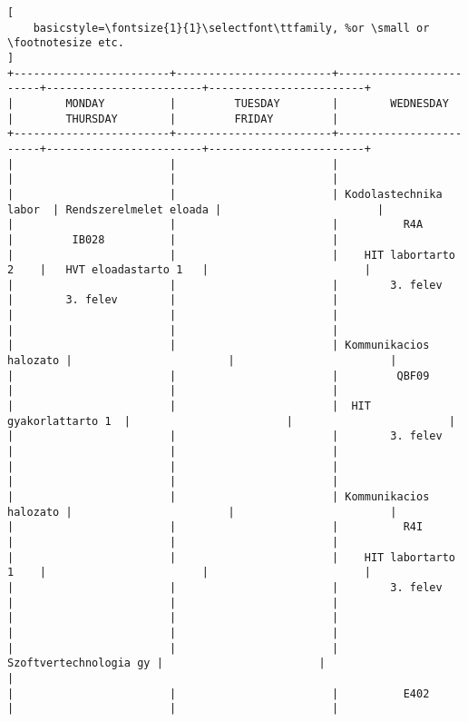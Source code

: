 \begin{lstlisting}[
    basicstyle=\fontsize{1}{1}\selectfont\ttfamily, %or \small or \footnotesize etc.
]
+------------------------+------------------------+------------------------+------------------------+------------------------+
|        MONDAY          |         TUESDAY        |        WEDNESDAY       |        THURSDAY        |         FRIDAY         |
+------------------------+------------------------+------------------------+------------------------+------------------------+
|                        |                        |                        |                        |                        | 
|                        |                        | Kodolastechnika labor  | Rendszerelmelet eloada |                        | 
|                        |                        |          R4A           |         IB028          |                        | 
|                        |                        |    HIT labortarto 2    |   HVT eloadastarto 1   |                        | 
|                        |                        |        3. felev        |        3. felev        |                        | 
|                        |                        |                        |                        |                        | 
|                        |                        | Kommunikacios halozato |                        |                        | 
|                        |                        |         QBF09          |                        |                        | 
|                        |                        |  HIT gyakorlattarto 1  |                        |                        | 
|                        |                        |        3. felev        |                        |                        | 
|                        |                        |                        |                        |                        | 
|                        |                        | Kommunikacios halozato |                        |                        | 
|                        |                        |          R4I           |                        |                        | 
|                        |                        |    HIT labortarto 1    |                        |                        | 
|                        |                        |        3. felev        |                        |                        | 
|                        |                        |                        |                        |                        | 
|                        |                        | Szoftvertechnologia gy |                        |                        | 
|                        |                        |          E402          |                        |                        | 

\end{lstlisting}
